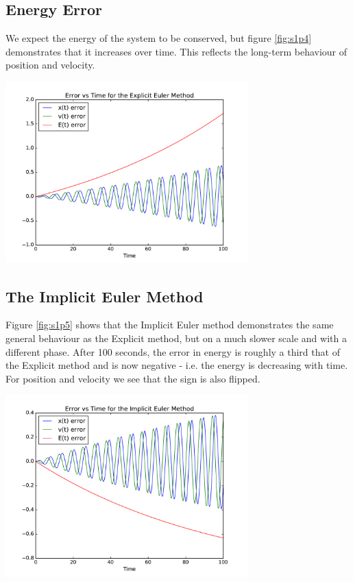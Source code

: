 \documentclass{article}
\newenvironment{Figure}
  {\par\medskip\noindent\minipage{\linewidth}}
  {\endminipage\par\medskip}
\begin{document}
\subsection{Energy Error}

We expect the energy of the system to be conserved, but figure \ref{fig:s1p4} demonstrates that it increases over time. This reflects the long-term behaviour of position and velocity.

\begin{Figure}
\centering
\includegraphics[width=0.7\textwidth]{images/Sec1Plt4.pdf}
\label{fig:s1p4}
\end{Figure}

\subsection{The Implicit Euler Method}

Figure \ref{fig:s1p5} shows that the Implicit Euler method demonstrates the same general behaviour as the Explicit method, but on a much slower scale and with a different phase. After 100 seconds, the error in energy is roughly a third that of the Explicit method and is now negative - i.e. the energy is decreasing with time. For position and velocity we see that the sign is also flipped.

\begin{Figure}
\centering
\includegraphics[width=0.7\textwidth]{images/Sec1Plt5.pdf}
\label{fig:s1p5}
\end{Figure}
\end{document}
